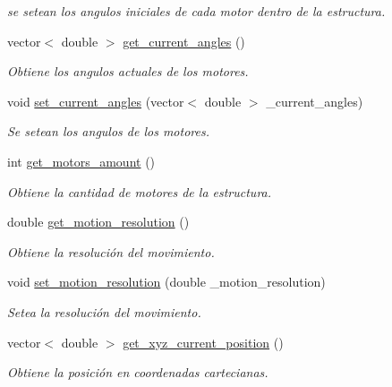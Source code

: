 \begin{DoxyCompactItemize}
\begin{DoxyCompactList}\small\item\em se setean los angulos iniciales de cada motor dentro de la estructura. \end{DoxyCompactList}\item 
vector$<$ double $>$ \hyperlink{class_motion__structure_a3f01cb966d8d700dfb32b2771956b37c}{get\-\_\-current\-\_\-angles} ()
\begin{DoxyCompactList}\small\item\em Obtiene los angulos actuales de los motores. \end{DoxyCompactList}\item 
void \hyperlink{class_motion__structure_a010655ae44e9b12bffa7f605dd02454a}{set\-\_\-current\-\_\-angles} (vector$<$ double $>$ \-\_\-current\-\_\-angles)
\begin{DoxyCompactList}\small\item\em Se setean los angulos de los motores. \end{DoxyCompactList}\item 
int \hyperlink{class_motion__structure_a7f36ab16180a36018516cee01ff1b666}{get\-\_\-motors\-\_\-amount} ()
\begin{DoxyCompactList}\small\item\em Obtiene la cantidad de motores de la estructura. \end{DoxyCompactList}\item 
double \hyperlink{class_motion__structure_a591d41b002285347d2f2f81a4ecb71ad}{get\-\_\-motion\-\_\-resolution} ()
\begin{DoxyCompactList}\small\item\em Obtiene la resolución del movimiento. \end{DoxyCompactList}\item 
void \hyperlink{class_motion__structure_a9d24593ceecdf101b83ea13e282a59af}{set\-\_\-motion\-\_\-resolution} (double \-\_\-motion\-\_\-resolution)
\begin{DoxyCompactList}\small\item\em Setea la resolución del movimiento. \end{DoxyCompactList}\item 
vector$<$ double $>$ \hyperlink{class_motion__structure_a9128b56d83680de910b5be7c78010458}{get\-\_\-xyz\-\_\-current\-\_\-position} ()
\begin{DoxyCompactList}\small\item\em Obtiene la posición en coordenadas cartecianas. \end{DoxyCompactList}\item 

\end{DoxyCompactItemize}
